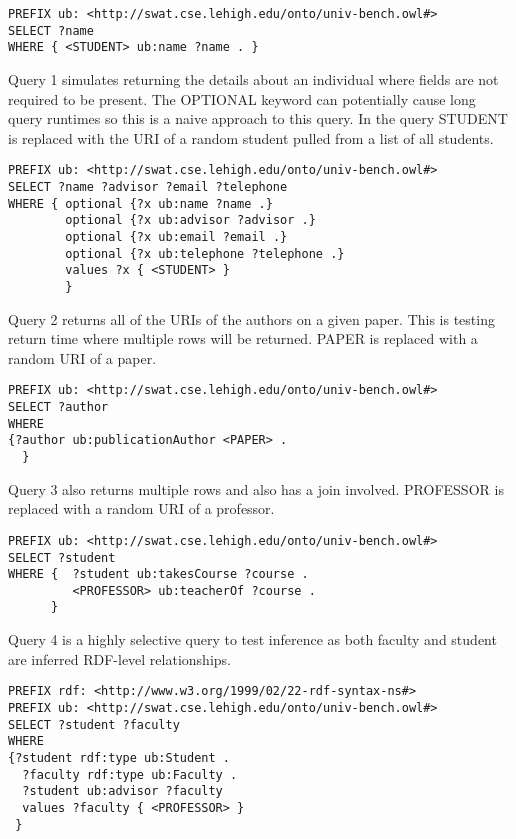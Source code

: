 \documentclass{llncs}
\begin{document}
\begin{lstlisting}[caption=Benchmark Query]
PREFIX ub: <http://swat.cse.lehigh.edu/onto/univ-bench.owl#>
SELECT ?name
WHERE { <STUDENT> ub:name ?name . }
\end{lstlisting}

\smallskip

Query 1 simulates returning the details about an individual where fields are not required to be present.  The OPTIONAL keyword can potentially cause long query runtimes so this is a naive approach to this query.  In the query STUDENT is replaced with the URI of a random student pulled from a list of all students.

\begin{lstlisting}[caption=Query 1]
PREFIX ub: <http://swat.cse.lehigh.edu/onto/univ-bench.owl#>
SELECT ?name ?advisor ?email ?telephone
WHERE { optional {?x ub:name ?name .}
        optional {?x ub:advisor ?advisor .}
        optional {?x ub:email ?email .}
        optional {?x ub:telephone ?telephone .}
        values ?x { <STUDENT> }
        }
\end{lstlisting}

\smallskip

Query 2 returns all of the URIs of the authors on a given paper.  This is testing return time where multiple rows will be returned.  PAPER is replaced with a random URI of a paper.

\begin{lstlisting}[caption=Query 2]
PREFIX ub: <http://swat.cse.lehigh.edu/onto/univ-bench.owl#>
SELECT ?author
WHERE
{?author ub:publicationAuthor <PAPER> .
  }
\end{lstlisting}
\smallskip

Query 3 also returns multiple rows and also has a join involved.  PROFESSOR is replaced with a random URI of a professor.

\begin{lstlisting}[caption=Query 3]
PREFIX ub: <http://swat.cse.lehigh.edu/onto/univ-bench.owl#>
SELECT ?student
WHERE {  ?student ub:takesCourse ?course .
         <PROFESSOR> ub:teacherOf ?course .
      }
\end{lstlisting}

\smallskip

Query 4 is a highly selective query to test inference as both faculty and student are inferred RDF-level relationships.

\begin{lstlisting}[caption=Query 4]
PREFIX rdf: <http://www.w3.org/1999/02/22-rdf-syntax-ns#>
PREFIX ub: <http://swat.cse.lehigh.edu/onto/univ-bench.owl#>
SELECT ?student ?faculty
WHERE
{?student rdf:type ub:Student .
  ?faculty rdf:type ub:Faculty .
  ?student ub:advisor ?faculty 
  values ?faculty { <PROFESSOR> }
 }
\end{lstlisting}
\end{document}
